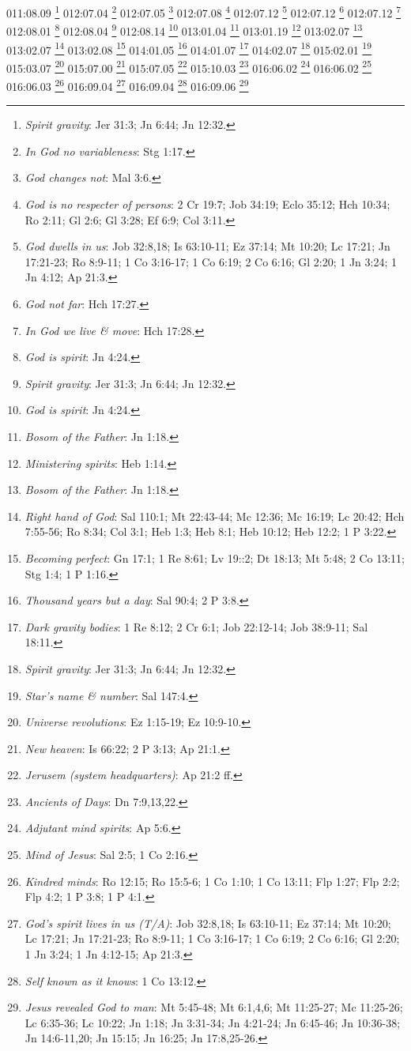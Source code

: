 {011:08.09 \footnote{\textit{Spirit gravity}: Jer 31:3; Jn 6:44; Jn 12:32.}
012:07.04 \footnote{\textit{In God no variableness}: Stg 1:17.}
012:07.05 \footnote{\textit{God changes not}: Mal 3:6.}
012:07.08 \footnote{\textit{God is no respecter of persons}: 2 Cr 19:7; Job 34:19; Eclo 35:12; Hch 10:34; Ro 2:11; Gl 2:6; Gl 3:28; Ef 6:9; Col 3:11.}
012:07.12 \footnote{\textit{God dwells in us}: Job 32:8,18; Is 63:10-11; Ez 37:14; Mt 10:20; Lc 17:21; Jn 17:21-23; Ro 8:9-11; 1 Co 3:16-17; 1 Co 6:19; 2 Co 6:16; Gl 2:20; 1 Jn 3:24; 1 Jn 4:12; Ap 21:3.}
012:07.12 \footnote{\textit{God not far}: Hch 17:27.}
012:07.12 \footnote{\textit{In God we live & move}: Hch 17:28.}
012:08.01 \footnote{\textit{God is spirit}: Jn 4:24.}
012:08.04 \footnote{\textit{Spirit gravity}: Jer 31:3; Jn 6:44; Jn 12:32.}
012:08.14 \footnote{\textit{God is spirit}: Jn 4:24.}
013:01.04 \footnote{\textit{Bosom of the Father}: Jn 1:18.}
013:01.19 \footnote{\textit{Ministering spirits}: Heb 1:14.}
013:02.07 \footnote{\textit{Bosom of the Father}: Jn 1:18.}
013:02.07 \footnote{\textit{Right hand of God}: Sal 110:1; Mt 22:43-44; Mc 12:36; Mc 16:19; Lc 20:42; Hch 7:55-56; Ro 8:34; Col 3:1; Heb 1:3; Heb 8:1; Heb 10:12; Heb 12:2; 1 P 3:22.}
013:02.08 \footnote{\textit{Becoming perfect}: Gn 17:1; 1 Re 8:61; Lv 19::2; Dt 18:13; Mt 5:48; 2 Co 13:11; Stg 1:4; 1 P 1:16.}
014:01.05 \footnote{\textit{Thousand years but a day}: Sal 90:4; 2 P 3:8.}
014:01.07 \footnote{\textit{Dark gravity bodies}: 1 Re 8:12; 2 Cr 6:1; Job 22:12-14; Job 38:9-11; Sal 18:11.}
014:02.07 \footnote{\textit{Spirit gravity}: Jer 31:3; Jn 6:44; Jn 12:32.}
015:02.01 \footnote{\textit{Star's name & number}: Sal 147:4.}
015:03.07 \footnote{\textit{Universe revolutions}: Ez 1:15-19; Ez 10:9-10.}
015:07.00 \footnote{\textit{New heaven}: Is 66:22; 2 P 3:13; Ap 21:1.}
015:07.05 \footnote{\textit{Jerusem (system headquarters)}: Ap 21:2 ff.}
015:10.03 \footnote{\textit{Ancients of Days}: Dn 7:9,13,22.}
016:06.02 \footnote{\textit{Adjutant mind spirits}: Ap 5:6.}
016:06.02 \footnote{\textit{Mind of Jesus}: Sal 2:5; 1 Co 2:16.}
016:06.03 \footnote{\textit{Kindred minds}: Ro 12:15; Ro 15:5-6; 1 Co 1:10; 1 Co 13:11; Flp 1:27; Flp 2:2; Flp 4:2; 1 P 3:8; 1 P 4:1.}
016:09.04 \footnote{\textit{God's spirit lives in us (T/A)}: Job 32:8,18; Is 63:10-11; Ez 37:14; Mt 10:20; Lc 17:21; Jn 17:21-23; Ro 8:9-11; 1 Co 3:16-17; 1 Co 6:19; 2 Co 6:16; Gl 2:20; 1 Jn 3:24; 1 Jn 4:12-15; Ap 21:3.}
016:09.04 \footnote{\textit{Self known as it knows}: 1 Co 13:12.}
016:09.06 \footnote{\textit{Jesus revealed God to man}: Mt 5:45-48; Mt 6:1,4,6; Mt 11:25-27; Mc 11:25-26; Lc 6:35-36; Lc 10:22; Jn 1:18; Jn 3:31-34; Jn 4:21-24; Jn 6:45-46; Jn 10:36-38; Jn 14:6-11,20; Jn 15:15; Jn 16:25; Jn 17:8,25-26.}
}
